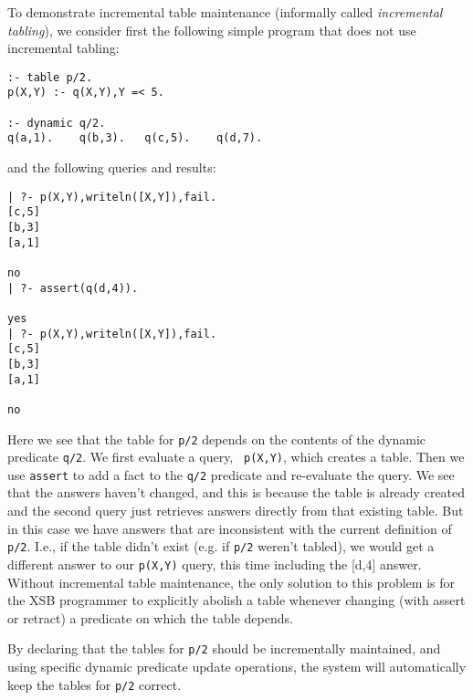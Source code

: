 To demonstrate incremental table maintenance (informally called {\em
  incremental tabling}), we consider first the following simple
program that does not use incremental tabling:
\begin{verbatim}
:- table p/2.
p(X,Y) :- q(X,Y),Y =< 5.

:- dynamic q/2.
q(a,1).    q(b,3).   q(c,5).    q(d,7).
\end{verbatim}
and the following queries and results:
\begin{verbatim}
| ?- p(X,Y),writeln([X,Y]),fail.
[c,5]
[b,3]
[a,1]

no
| ?- assert(q(d,4)).

yes
| ?- p(X,Y),writeln([X,Y]),fail.
[c,5]
[b,3]
[a,1]

no
\end{verbatim}
%
Here we see that the table for {\tt p/2} depends on the contents of
the dynamic predicate {\tt q/2}.  We first evaluate a query, {\tt
  p(X,Y)}, which creates a table.  Then we use {\tt assert} to add a
fact to the {\tt q/2} predicate and re-evaluate the query.  We see
that the answers haven't changed, and this is because the table is
already created and the second query just retrieves answers directly
from that existing table.  But in this case we have answers that are
inconsistent with the current definition of {\tt p/2}.  I.e., if the
table didn't exist (e.g. if {\tt p/2} weren't tabled), we would get a
different answer to our {\tt p(X,Y)} query, this time including the
[d,4] answer.  Without incremental table maintenance, the only
solution to this problem is for the XSB programmer to explicitly
abolish a table whenever changing (with assert or retract) a predicate
on which the table depends.

By declaring that the tables for {\tt p/2} should be incrementally
maintained, and using specific dynamic predicate update operations,
the system will automatically keep the tables for {\tt p/2} correct.

